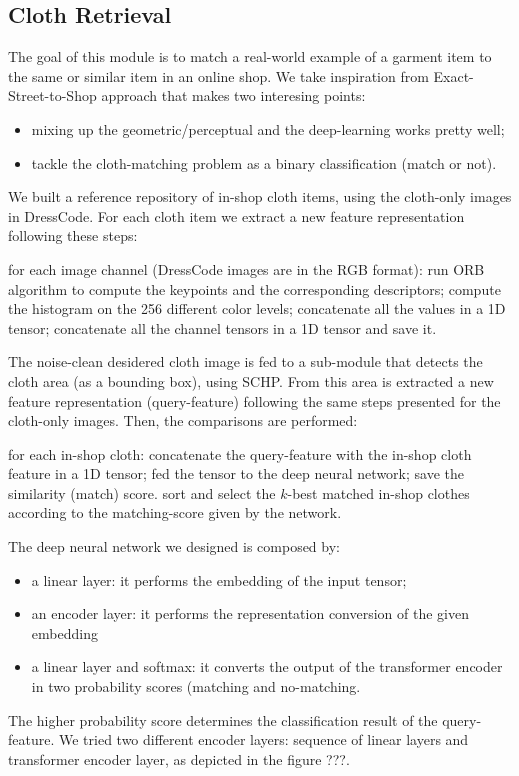 \subsection{Cloth Retrieval}

The goal of this module is to match a real-world example of a garment item to the same or similar item in an online shop. We take inspiration from Exact-Street-to-Shop approach that makes two interesing points:
\begin{itemize}[noitemsep]
	\item mixing up the geometric/perceptual and the deep-learning works pretty well;
	\item tackle the cloth-matching problem as a binary classification (match or not).
\end{itemize}

We built a reference repository of in-shop cloth items, using the cloth-only images in DressCode. For each cloth item we extract a new feature representation following these steps:
\begin{outline}
 \1 for each image channel (DressCode images are in the RGB format):
   \2 run ORB algorithm to compute the keypoints and the corresponding descriptors;
   \2 compute the histogram on the 256 different color levels;
   \2 concatenate all the values in a 1D tensor;
 \1 concatenate all the channel tensors in a 1D tensor and save it.
\end{outline}

The noise-clean desidered cloth image is fed to a sub-module that detects the cloth area (as a bounding box), using SCHP. From this area is extracted a new feature representation (query-feature) following the same steps presented for the cloth-only images. Then, the comparisons are performed:
\begin{outline}
\1 for each in-shop cloth:
	\2 concatenate the query-feature with the in-shop cloth feature in a 1D tensor;
	\2 fed the tensor to the deep neural network;
	\2 save the similarity (match) score.
\1 sort and select the $k$-best matched in-shop clothes according to the matching-score given by the network. 
\end{outline}

The deep neural network we designed is composed by:
\begin{itemize}
	\item{a linear layer: it performs the embedding of the input tensor;}
	\item{an encoder layer: it performs the representation conversion of the given embedding}
	\item{a linear layer and softmax: it converts the output of the transformer encoder in two probability scores (matching and no-matching.}
\end{itemize}
The higher probability score determines the classification result of the query-feature. We tried two different encoder layers: sequence of linear layers and transformer encoder layer, as depicted in the figure ???.

